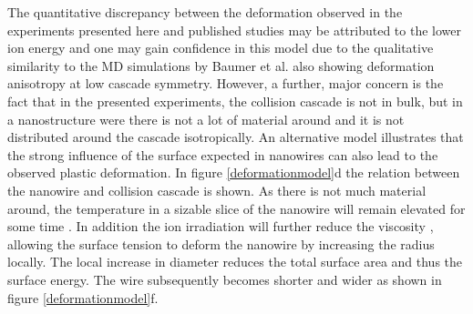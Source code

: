 \documentclass[12pt,
paper=a4,				
DIV=calc,		  %
BCOR=16mm,	  %
headinclude,
openany
]{scrbook}
\begin{document}
The quantitative discrepancy between the deformation observed in the experiments presented here and published studies may be attributed to the lower ion energy and one may gain confidence in this model due to the qualitative similarity to the MD simulations by Baumer et al. \cite{baumer_prediction_2014} also showing deformation anisotropy at low cascade symmetry. However, a further, major concern is the fact that in the presented experiments, the collision cascade is not in bulk, but in a nanostructure were there is not a lot of material around and it is not distributed around the cascade isotropically. An alternative model illustrates that the strong influence of the surface expected in nanowires can also lead to the observed plastic deformation. In figure \ref{deformationmodel}d the relation between the nanowire and collision cascade is shown. As there is not much material around, the temperature in a sizable slice of the nanowire will remain elevated for some time \cite{borschel_ion-solid_2012,greaves_enhanced_2013,anders_sputtering_2015,johannes_ion_2015}. In addition the ion irradiation will further reduce the viscosity \cite{snoeks_stress_1997,hu_burrowing_2002,mayr_mechanisms_2003}, allowing the surface tension to deform the nanowire by increasing the radius locally. The local increase in diameter reduces the total surface area and thus the surface energy. The wire subsequently becomes shorter and wider as shown in figure \ref{deformationmodel}f.
\end{document}
